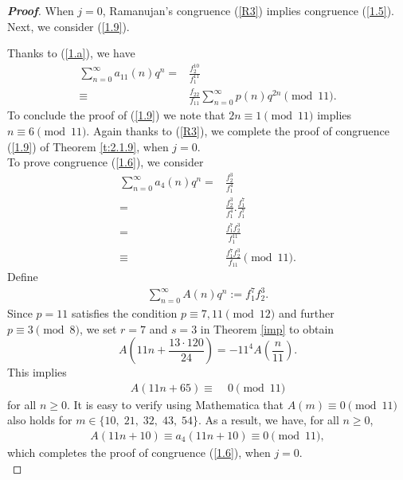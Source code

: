 \documentclass[a4paper,12pt,reqno]{amsart}
\numberwithin{equation}{section}
\begin{document}
\begin{proof}[\it\textbf{Proof}]When $j=0$, Ramanujan's congruence (\ref{R3}) implies congruence (\ref{1.5}).  Next, we consider (\ref{1.9}). 
	
	Thanks to (\ref{1.a}), we have
	\begin{align*}
		\sum_{n=0}^{\infty}a_{11}(n)q^n=&\frac{f_2^{10}}{f_1^{11}}\\
		\equiv &\frac{f_{22}}{f_{11}}\sum_{n=0}^{\infty}p(n)q^{2n}\pmod{11}.
	\end{align*}
	To conclude the proof of (\ref{1.9}) we note that $2n\equiv1\pmod{11}$ implies $n\equiv6\pmod{11}$. Again thanks to (\ref{R3}), we complete the proof of congruence (\ref{1.9}) of Theorem \ref{t:2.1.9}, when $j=0$.\\
	To prove congruence (\ref{1.6}), we consider
	\begin{align*}
		\sum_{n=0}^{\infty}a_{4}(n)q^n=&\frac{f_2^{3}}{f_1^{4}}\\
		=&\frac{f_2^{3}}{f_1^{4}}.\frac{f_1^7}{f_1^7}\\
		=&\frac{f_1^7f_2^3}{f_1^{11}}\\
		\equiv&\frac{f_1^7f_2^3}{f_{11}}\pmod{11}.
	\end{align*}
	Define
	\begin{align*}
		\sum_{n=0}^{\infty}A(n)q^n := {f_1^7}{f_2^3}.
	\end{align*}
	Since $p=11$ satisfies the condition $p\equiv7, 11\pmod{12}$ and further $p\equiv3\pmod{8}$, we set $r=7$ and $s=3$ in Theorem \ref{imp} to obtain 
	$$A\left( 11n + \frac{13\cdot 120}{24}\right)=-{11}^4 A\left(\frac{n}{11}\right).$$
	This implies
	\begin{align*}
		A\left( 11n + 65\right)\equiv&\; 0\pmod{11}
	\end{align*}
	for all $n\geq 0$.  
	It is easy to verify  using Mathematica that $A(m)\equiv 0 \pmod{11}$ also holds for $m\in \{10,\;21,\;32,\; 43,\;54\}$. As a result, we have, for all $n\geq 0$, 
	\begin{align*}
		A\left( 11n + 10\right) \equiv a_4(11n+10)\equiv 0 \pmod{11},
	\end{align*}
	which completes the proof of congruence (\ref{1.6}), when $j=0$.\\
	

\end{proof}
\end{document}
